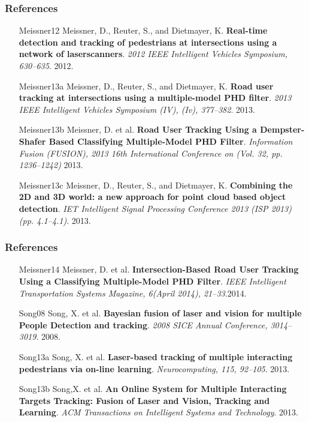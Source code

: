 \documentclass[table]{beamer}
\begin{document}
\frame
{
	\frametitle{References}
		\footnotesize{
	\begin{itemize}[leftmargin=.6in]
		\item [Meissner12] Meissner, D., Reuter, S., and Dietmayer, K. \textbf{Real-time detection and tracking of pedestrians at intersections using a network of laserscanners}. \textit{2012 IEEE Intelligent Vehicles Symposium, 630–635}. 2012.
		\item [Meissner13a] Meissner, D., Reuter, S., and Dietmayer, K. \textbf{Road user tracking at intersections using a multiple-model PHD filter}. \textit{2013 IEEE Intelligent Vehicles Symposium (IV), (Iv), 377–382}. 2013.
		\item [Meissner13b] Meissner, D. et al. \textbf{Road User Tracking Using a Dempster-Shafer Based Classifying Multiple-Model PHD Filter}. \textit{Information Fusion (FUSION), 2013 16th International Conference on (Vol. 32, pp. 1236–1242)} 2013.
		\item [Meissner13c] Meissner, D., Reuter, S., and Dietmayer, K. \textbf{Combining the 2D and 3D world: a new approach for point cloud based object detection}. \textit{IET Intelligent Signal Processing Conference 2013 (ISP 2013) (pp. 4.1–4.1)}. 2013.				
	\end{itemize}	
	}
}

\frame
{
	\frametitle{References}
		\footnotesize{
	\begin{itemize}[leftmargin=.6in]
		\item [Meissner14] Meissner, D. et al. \textbf{Intersection-Based Road User Tracking Using a Classifying Multiple-Model PHD Filter}.\textit{ IEEE Intelligent Transportation Systems Magazine, 6(April 2014), 21–33}.2014.
		\item [Song08] Song, X. et al. \textbf{Bayesian fusion of laser and vision for multiple People Detection and tracking}. \textit{2008 SICE Annual Conference, 3014–3019}. 2008.
		\item [Song13a] Song, X. et al. \textbf{Laser-based tracking of multiple interacting pedestrians via on-line learning}. \textit{Neurocomputing, 115, 92–105}. 2013.
		\item [Song13b] Song,X. et al. \textbf{An Online System for Multiple Interacting Targets Tracking: Fusion of Laser and Vision, Tracking and Learning}. \textit{ACM Transactions on Intelligent Systems and Technology}. 2013.		
	\end{itemize}	
	}
}
\end{document}
